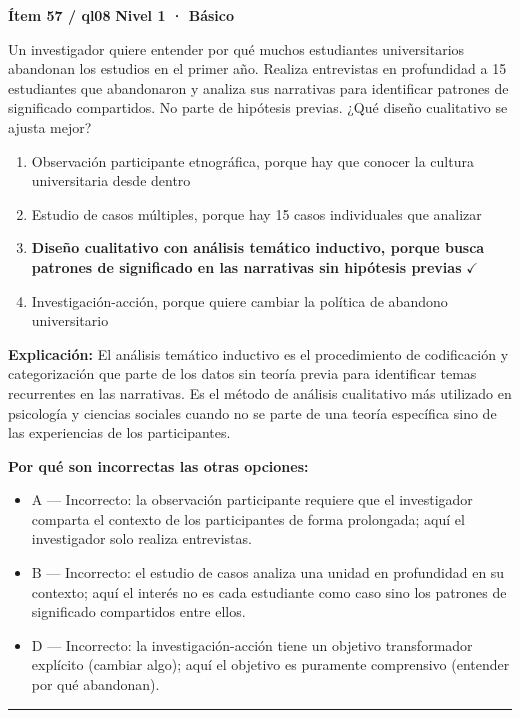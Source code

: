 \documentclass[12pt,a4paper]{article}
\begin{document}
\begin{mdframed}[backgroundcolor=fondogris,linecolor=azul,linewidth=1pt,innerleftmargin=10pt,innerrightmargin=10pt,innertopmargin=7pt,innerbottommargin=7pt]
\textbf{Ítem 57 / ql08} \hfill {\small\bfseries\color{azul} Nivel 1 · Básico}
\end{mdframed}

Un investigador quiere entender por qué muchos estudiantes universitarios abandonan los estudios en el primer año. Realiza entrevistas en profundidad a 15 estudiantes que abandonaron y analiza sus narrativas para identificar patrones de significado compartidos. No parte de hipótesis previas. ¿Qué diseño cualitativo se ajusta mejor?

\begin{enumerate}
  \item[A.] Observación participante etnográfica, porque hay que conocer la cultura universitaria desde dentro
  \item[B.] Estudio de casos múltiples, porque hay 15 casos individuales que analizar
  \item[\textbf{\color{verde}C.}] \textbf{\color{verde} Diseño cualitativo con análisis temático inductivo, porque busca patrones de significado en las narrativas sin hipótesis previas} \hfill $\checkmark$
  \item[D.] Investigación-acción, porque quiere cambiar la política de abandono universitario
\end{enumerate}

\noindent\textbf{\color{azul}Explicación:} El análisis temático inductivo es el procedimiento de codificación y categorización que parte de los datos sin teoría previa para identificar temas recurrentes en las narrativas. Es el método de análisis cualitativo más utilizado en psicología y ciencias sociales cuando no se parte de una teoría específica sino de las experiencias de los participantes.

\noindent\textbf{\color{gris}Por qué son incorrectas las otras opciones:}
\begin{itemize}
  \item {\small A — Incorrecto: la observación participante requiere que el investigador comparta el contexto de los participantes de forma prolongada; aquí el investigador solo realiza entrevistas.}
  \item {\small B — Incorrecto: el estudio de casos analiza una unidad en profundidad en su contexto; aquí el interés no es cada estudiante como caso sino los patrones de significado compartidos entre ellos.}
  \item {\small D — Incorrecto: la investigación-acción tiene un objetivo transformador explícito (cambiar algo); aquí el objetivo es puramente comprensivo (entender por qué abandonan).}
\end{itemize}
\vspace{8pt}\hrule\vspace{10pt}
\end{document}
